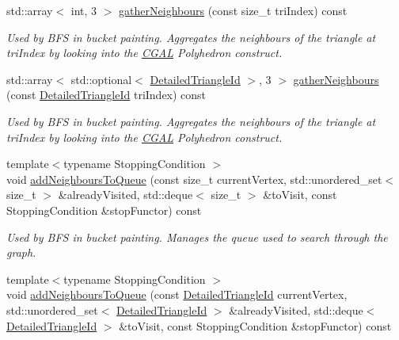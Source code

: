 \begin{DoxyCompactItemize}
std\+::array$<$ int, 3 $>$ \mbox{\hyperlink{classpepr3d_1_1_geometry_aeabf9a91453ddd3d744ccbc862583874}{gather\+Neighbours}} (const size\+\_\+t tri\+Index) const
\begin{DoxyCompactList}\small\item\em Used by B\+FS in bucket painting. Aggregates the neighbours of the triangle at tri\+Index by looking into the \mbox{\hyperlink{namespace_c_g_a_l}{C\+G\+AL}} Polyhedron construct. \end{DoxyCompactList}\item 
\mbox{\label{classpepr3d_1_1_geometry_a1638b74697c69d6dfb5125092130a9a0}} 
std\+::array$<$ std\+::optional$<$ \mbox{\hyperlink{structpepr3d_1_1_detailed_triangle_id}{Detailed\+Triangle\+Id}} $>$, 3 $>$ \mbox{\hyperlink{classpepr3d_1_1_geometry_a1638b74697c69d6dfb5125092130a9a0}{gather\+Neighbours}} (const \mbox{\hyperlink{structpepr3d_1_1_detailed_triangle_id}{Detailed\+Triangle\+Id}} tri\+Index) const
\begin{DoxyCompactList}\small\item\em Used by B\+FS in bucket painting. Aggregates the neighbours of the triangle at tri\+Index by looking into the \mbox{\hyperlink{namespace_c_g_a_l}{C\+G\+AL}} Polyhedron construct. \end{DoxyCompactList}\item 
\mbox{\label{classpepr3d_1_1_geometry_ae361aadf7f7b305ec57f7d0c3f5ec076}} 
{\footnotesize template$<$typename Stopping\+Condition $>$ }\\void \mbox{\hyperlink{classpepr3d_1_1_geometry_ae361aadf7f7b305ec57f7d0c3f5ec076}{add\+Neighbours\+To\+Queue}} (const size\+\_\+t current\+Vertex, std\+::unordered\+\_\+set$<$ size\+\_\+t $>$ \&already\+Visited, std\+::deque$<$ size\+\_\+t $>$ \&to\+Visit, const Stopping\+Condition \&stop\+Functor) const
\begin{DoxyCompactList}\small\item\em Used by B\+FS in bucket painting. Manages the queue used to search through the graph. \end{DoxyCompactList}\item 
\mbox{\label{classpepr3d_1_1_geometry_a598ec7cc38c6849908d97fb1ee482db5}} 
{\footnotesize template$<$typename Stopping\+Condition $>$ }\\void \mbox{\hyperlink{classpepr3d_1_1_geometry_a598ec7cc38c6849908d97fb1ee482db5}{add\+Neighbours\+To\+Queue}} (const \mbox{\hyperlink{structpepr3d_1_1_detailed_triangle_id}{Detailed\+Triangle\+Id}} current\+Vertex, std\+::unordered\+\_\+set$<$ \mbox{\hyperlink{structpepr3d_1_1_detailed_triangle_id}{Detailed\+Triangle\+Id}} $>$ \&already\+Visited, std\+::deque$<$ \mbox{\hyperlink{structpepr3d_1_1_detailed_triangle_id}{Detailed\+Triangle\+Id}} $>$ \&to\+Visit, const Stopping\+Condition \&stop\+Functor) const

\end{DoxyCompactItemize}
